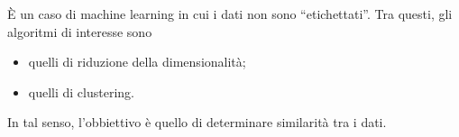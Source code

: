 \documentclass{subfiles}
\begin{document}
\`E un caso di machine learning in cui i dati non sono ``etichettati''.
Tra questi, gli algoritmi di interesse sono
\begin{itemize}
    \item quelli di riduzione della dimensionalità;
    \item quelli di clustering.
\end{itemize}
In tal senso, l'obbiettivo è quello di determinare similarità tra i dati.
\end{document}
